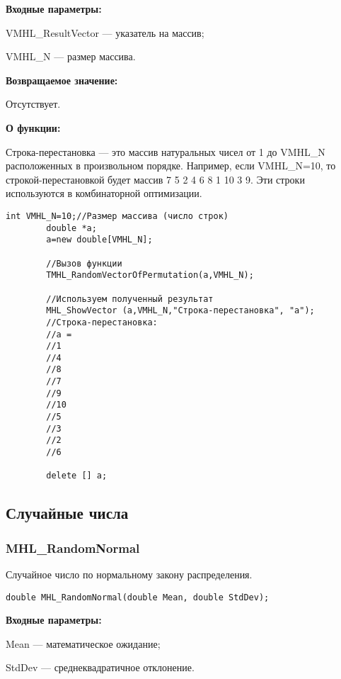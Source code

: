 \documentclass[a4paper,12pt]{article}
\begin{document}
\textbf{Входные параметры:}
 
VMHL\_ResultVector --- указатель на массив;
 
VMHL\_N --- размер массива.

\textbf{Возвращаемое значение:} 

Отсутствует.

\textbf{О функции:}

Строка-перестановка --- это массив натуральных чисел от 1 до VMHL\_N расположенных в произвольном порядке. Например, если VMHL\_N=10, то строкой-перестановкой будет массив 7 5 2 4 6 8 1 10 3 9. Эти строки используются в комбинаторной оптимизации.


\begin{lstlisting}[label=code_use_TMHL_RandomVectorOfPermutation,caption=Пример использования]
        int VMHL_N=10;//Размер массива (число строк)
        double *a;
        a=new double[VMHL_N];

        //Вызов функции
        TMHL_RandomVectorOfPermutation(a,VMHL_N);

        //Используем полученный результат
        MHL_ShowVector (a,VMHL_N,"Строка-перестановка", "a");
        //Строка-перестановка:
        //a =	
        //1
        //4
        //8
        //7
        //9
        //10
        //5
        //3
        //2
        //6

        delete [] a;
\end{lstlisting}

\subsection{Случайные числа}

\subsubsection{MHL\_RandomNormal}\label{MHL_RandomNormal}

Случайное число по нормальному закону распределения.


\begin{lstlisting}[label=code_syntax_MHL_RandomNormal,caption=Синтаксис]
double MHL_RandomNormal(double Mean, double StdDev);
\end{lstlisting}

\textbf{Входные параметры:}

Mean --- математическое ожидание;

 StdDev --- среднеквадратичное отклонение.
\end{document}
